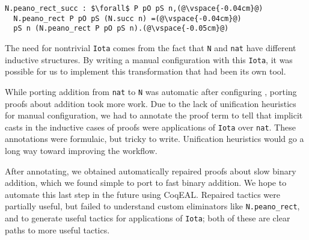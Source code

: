 \begin{lstlisting}
N.peano_rect_succ : $\forall$ P pO pS n,(@\vspace{-0.04cm}@)
  N.peano_rect P pO pS (N.succ n) =(@\vspace{-0.04cm}@)
  pS n (N.peano_rect P pO pS n).(@\vspace{-0.05cm}@)
\end{lstlisting}
%
The need for nontrivial \lstinline{Iota} comes from the fact that \lstinline{N} and \lstinline{nat}
have different inductive structures.
By writing a manual configuration with this \lstinline{Iota}, it was possible for us to implement this transformation 
that had been its own tool.

While porting addition from \lstinline{nat} to \lstinline{N} was automatic after configuring \toolname,
porting proofs about addition took more work.
Due to the lack of unification heuristics for manual configuration,
we had to annotate the proof term to tell \toolname that implicit casts in the inductive cases of proofs were applications of \lstinline{Iota}
over \lstinline{nat}.
These annotations were formulaic, but tricky to write.
Unification heuristics would go a long way toward improving the workflow. %

After annotating, we obtained automatically repaired proofs about slow binary addition,
which we found simple to port to fast binary addition.
We hope to automate this last step in the future using CoqEAL. %
Repaired tactics were partially useful, but failed to understand custom eliminators like \lstinline{N.peano_rect}, and to generate useful
tactics for applications of \lstinline{Iota}; both of these are clear paths to more useful tactics.


